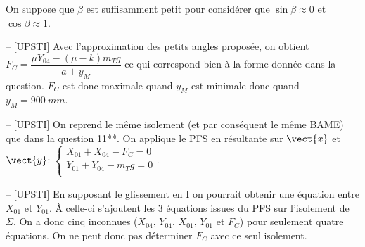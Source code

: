 On suppose que \(\beta\) est suffisamment petit pour considérer que \(\sin \beta \approx 0\) et \(\cos \beta \approx 1\).\\


\ifprof
\begin{corrige}-- [UPSTI]
Avec l’approximation des petits angles proposée, on obtient $F_C= \dfrac{\mu Y_{04}-(\mu -k) m_T g}{a+y_M}$ ce qui correspond bien à la forme donnée dans la question.
$F_C$ est donc maximale quand $y_M$ est minimale donc quand $y_M=\SI{900}{mm}$.
\end{corrige}
\else
\fi

\ifprof
\begin{corrige}-- [UPSTI]
On reprend le même isolement (et par conséquent le même BAME) que dans la question 11**.
On applique le PFS en résultante sur $\vect{x}$ et $\vect{y}$:
$\left\{
\begin{array}{l}
X_{01}+X_{04}-F_C=0 \\
Y_{01}+Y_{04}-m_T g=0 \\
\end{array}
\right.
$.

\end{corrige}
\else
\fi
\ifprof
\begin{corrige}-- [UPSTI]
En supposant le glissement en I on pourrait obtenir une équation entre $X_{01}$ et $Y_{01}$. À celle-ci s’ajoutent les 3 équations issues du PFS sur l’isolement de $\Sigma$. On a donc cinq inconnues ($X_{04}$, $Y_{04}$, $X_{01}$, $Y_{01}$ et $F_C$) pour seulement quatre équations. On ne peut donc pas déterminer $F_C$ avec ce seul isolement.
\end{corrige}
\else
\fi

